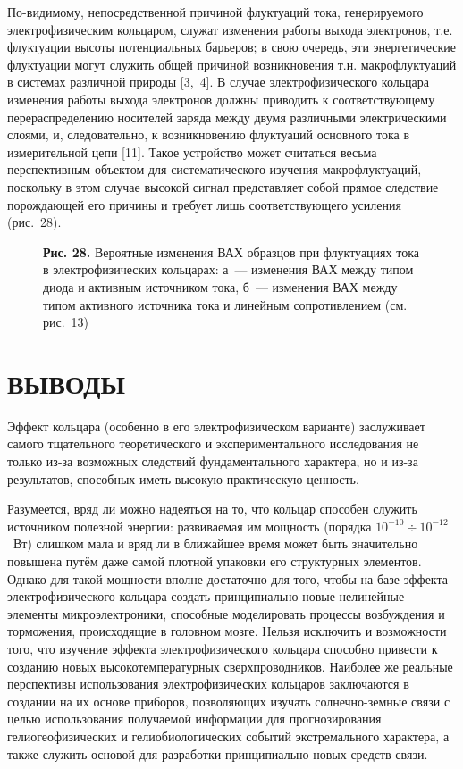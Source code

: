 \documentclass[12pt,a4paper]{article}
\begin{document}
По-видимому, непосредственной причиной флуктуаций тока, генерируемого
электрофизическим кольцаром, служат изменения работы выхода электронов, т.е.
флуктуации высоты потенциальных барьеров; в свою очередь, эти энергетические
флуктуации могут служить общей причиной возникновения т.н. макрофлуктуаций в
системах различной природы [3,~4]. В случае электрофизического кольцара
изменения работы выхода электронов должны приводить к соответствующему
перераспределению носителей заряда между двумя различными электрическими
слоями, и, следовательно, к возникновению флуктуаций основного тока в
измерительной цепи [11]. Такое устройство может считаться весьма перспективным
объектом для систематического изучения макрофлуктуаций, поскольку в этом случае
высокой сигнал представляет собой прямое следствие порождающей его причины и
требует лишь соответствующего усиления (рис.~28).

\begin{figure}[h]
\centering
\caption*{\textbf{Рис. 28.} Вероятные изменения ВАХ образцов при флуктуациях
тока в электрофизических кольцарах: а~— изменения ВАХ между типом диода и
активным источником тока, б~— изменения ВАХ между типом активного источника
тока и линейным сопротивлением (см. рис.~13)}
\end{figure}

\newpage
\section*{ВЫВОДЫ}

Эффект кольцара (особенно в его электрофизическом варианте) заслуживает самого
тщательного теоретического и экспериментального исследования не только из-за
возможных следствий фундаментального характера, но и из-за результатов,
способных иметь высокую практическую ценность.

Разумеется, вряд ли можно надеяться на то, что кольцар способен служить
источником полезной энергии: развиваемая им мощность (порядка $10^{-10} \div
10^{-12}$~Вт) слишком мала и вряд ли в ближайшее время может быть значительно
повышена путём даже самой плотной упаковки его структурных элементов. Однако
для такой мощности вполне достаточно для того, чтобы на базе эффекта
электрофизического кольцара создать принципиально новые нелинейные элементы
микроэлектроники, способные моделировать процессы возбуждения и торможения,
происходящие в головном мозге. Нельзя исключить и возможности того, что
изучение эффекта электрофизического кольцара способно привести к созданию новых
высокотемпературных сверхпроводников. Наиболее же реальные перспективы
использования электрофизических кольцаров заключаются в создании на их основе
приборов, позволяющих изучать солнечно-земные связи с целью использования
получаемой информации для прогнозирования гелиогеофизических и гелиобиологических
событий экстремального характера, а также служить основой для разработки
принципиально новых средств связи.
\end{document}

